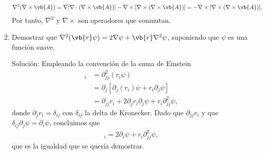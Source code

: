 \begin{enumerate}[label=\textbf{Ejercicio \thechapter.\arabic*},resume]
\begin{align*}
\nabla^2(\nabla\times\vb{A})=\nabla[\nabla\cdot(\nabla\times\vb{A})  ]-  \nabla\times[\nabla\times(\nabla\times \vb{A})] = -  \nabla\times[\nabla\times(\nabla\times \vb{A})].
	\end{align*}
Por tanto, $\nabla^2$ y $\nabla\times$ son operadores que conmutan.	
%
\item Demostrar que $ \nabla^2 (\vb{r}\psi)=2\nabla\psi+\vb{r}\nabla^2\psi$, suponiendo que $\psi$ es una función suave.
\label{ex:lap-r-psi}
\item[\color{blue} Solución:]
	Empleando la convención de la suma de Einstein 
	\begin{align*}
	[\nabla^2 (\vb{r}\psi)]_i &= \partial^2_{jj}(r_i\psi)\\
		&=\partial_j [\partial_j (r_i)\psi+r_i\partial_j\psi]\\
		&=\partial_{jj}{r_i} + 2 \partial_j r_i\partial_j\psi+r_i\partial^2_{jj}\psi,
	\end{align*}
donde $\partial_j r_i = \delta_{ij}$ con $\delta_{ij}$ la delta de Kronecker. Dado que $\partial_{jj}{r_i}$ y que $\delta_{ij}\partial_j\psi =\partial_i\psi $, concluimos que
	\begin{align*}
	[\nabla^2 (\vb{r}\psi)]_i  = 2 \partial_i\psi+r_i\partial^2_{jj}\psi,
	\end{align*}
que es la  igualdad que se quería demostrar.	
\end{enumerate}
